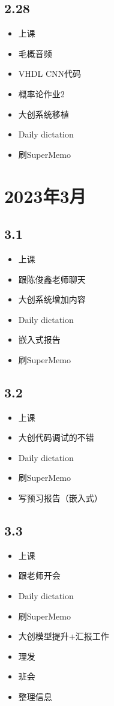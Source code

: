 \documentclass[UTF8]{ctexart}
\begin{document}
\subsection*{2.28}
\begin{itemize}
    \item 上课
    \item 毛概音频
    \item VHDL CNN代码
    \item 概率论作业2
    \item 大创系统移植
    \item Daily dictation
    \item 刷SuperMemo
\end{itemize}
\section*{2023年3月}
\subsection*{3.1}
\begin{itemize}
    \item 上课
    \item 跟陈俊鑫老师聊天
    \item 大创系统增加内容
    \item Daily dictation
    \item 嵌入式报告
    \item 刷SuperMemo
\end{itemize}
\subsection*{3.2}
\begin{itemize}
    \item 上课
    \item 大创代码调试的不错
    \item Daily dictation
    \item 刷SuperMemo
    \item 写预习报告（嵌入式）
\end{itemize}
\subsection*{3.3}
\begin{itemize}
    \item 上课
    \item 跟老师开会
    \item Daily dictation
    \item 刷SuperMemo
    \item 大创模型提升+汇报工作
    \item 理发
    \item 班会
    \item 整理信息
\end{itemize}
\end{document}
